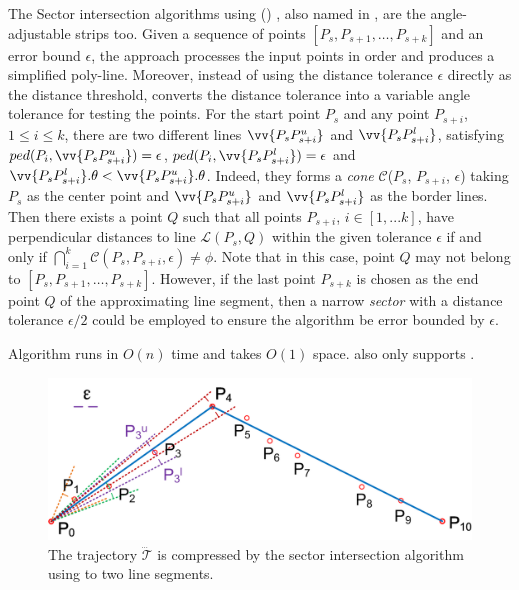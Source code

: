 The Sector intersection algorithms using \ped (\siped) \cite{Williams:Longest,Sklansky:Cone,Dunham:Cone}, also named \sleeve in \cite{Zhao:Sleeve}, are {the angle-adjustable strips too}.
Given a sequence of points $[P_{s}, P_{s+1}, \ldots, P_{s+k}]$ and an error bound $\epsilon$, the \siped approach processes the input points in order and produces a simplified poly-line.  Moreover, instead of using the distance tolerance $\epsilon$ directly as the distance threshold, \siped converts the distance tolerance into a variable angle tolerance for testing the points.
%
For the start point $P_s$ and any point $P_{s+i}$, $1\le i\le k$, there are two different lines $\vv{P_sP^u_{s+i}}$ and $\vv{P_sP^l_{s+i}}$, satisfying $ped(P_i, \vv{P_sP^u_{s+i}}) = \epsilon$, $ped(P_i, \vv{P_sP^l_{s+i}}) = \epsilon$ and $\vv{P_sP^l_{s+i}}.\theta < \vv{P_sP^u_{s+i}}.\theta$. Indeed, they forms a \emph{cone} $\mathcal{C}$($P_s$, $P_{s+i}$, $\epsilon$) taking $P_s$ as the center point and $\vv{P_sP^u_{s+i}}$ and $\vv{P_sP^l_{s+i}}$ as the border lines.
Then there exists a point $Q$ such that all points $P_{s+i}$, $i \in [1, ... k]$, have perpendicular distances to
line $\mathcal{L}(P_s,Q)$ within the given \ped tolerance $\epsilon$ if and only if $\bigcap_{i=1}^{k}\mathcal{C}(P_s, P_{s+i}, \epsilon) \ne \phi$.
Note that in this case, point $Q$ may not belong to $[P_{s}, P_{s+1}, \ldots, P_{s+k}]$.
However, if the last point $P_{s+k}$ is chosen as the end point $Q$ of the approximating line segment, then a narrow \emph{sector} with a distance tolerance $\epsilon/2$ could be employed to ensure the algorithm be \ped error bounded by $\epsilon$\cite{Zhao:Sleeve}.

Algorithm \siped runs in $O(n)$ time and takes $O(1)$ space.
\siped also only supports \ped.


\begin{figure}[tb!]
	\centering
	\includegraphics[scale=0.66]{figures/Fig-sleeve.png}
	\vspace{-1ex}
	\caption{\small The trajectory $\dddot{\mathcal{T}}$ is compressed by the sector intersection algorithm using \ped to two line segments.}
	\vspace{-2ex}
	\label{fig:sleeve}
\end{figure}



